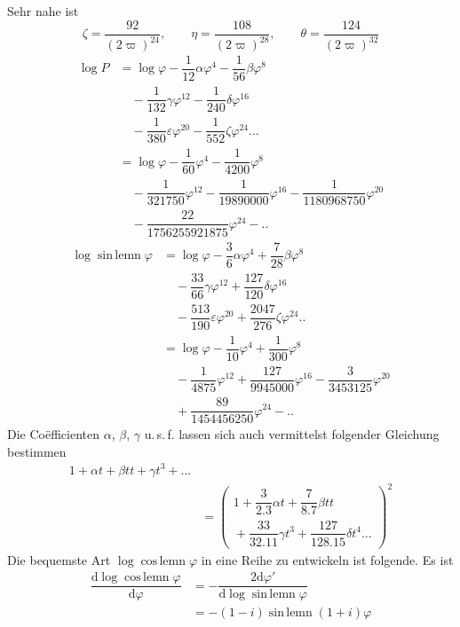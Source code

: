 Sehr nahe ist
\[
\zeta=\dfrac{92}{(2\varpi)^{24}},\qquad
\eta=\dfrac{108}{(2\varpi)^{28}},\qquad
\theta=\dfrac{124}{(2\varpi)^{32}}
\]
\[
\begin{aligned}
\log P&=\log\varphi-\dfrac1{12}\alpha\varphi^4-\dfrac1{56}\beta\varphi^8
\\[6pt]&\quad{}-\dfrac1{132}\gamma\varphi^{12}-\dfrac1{240}\delta\varphi^{16}
\\[6pt]&\quad{}-\dfrac1{380}\varepsilon\varphi^{20}-\dfrac1{552}\zeta\varphi^{24}\mathord{.}\mathord{.}\mathord{.}\\[6pt]
&=\log\varphi-\dfrac1{60}\varphi^4-\dfrac1{4200}\varphi^8
\\[6pt]&\quad{}-\dfrac1{321750}\varphi^{12}-\dfrac1{19890000}\varphi^{16}
-\dfrac1{1180968750}\varphi^{20}\\[6pt]
&\quad-\dfrac{22}{1756255921875}\varphi^{24}-\mathord{.}\mathord{.}
\end{aligned}
\]
\[
\begin{aligned}
\log\operatorname{sin\,lemn}\varphi
&=\log\varphi-\dfrac36\alpha\varphi^4+\dfrac7{28}\beta\varphi^8
\\[6pt]&\quad{}-\dfrac{33}{66}\gamma\varphi^{12}+\dfrac{127}{120}\delta\varphi^{16}
\\[6pt]&\quad{}-\dfrac{513}{190}\varepsilon\varphi^{20}+\dfrac{2047}{276}\zeta\varphi^{24}\mathord{.}\mathord{.}\\[6pt]
&=\log\varphi-\dfrac1{10}\varphi^4+\dfrac1{300}\varphi^8
\\[6pt]&\quad{}-\dfrac1{4875}\varphi^{12}+\dfrac{127}{9945000}\varphi^{16}
-\dfrac3{3453125}\varphi^{20}\\[6pt]
&\quad+\dfrac{89}{1454456250}\varphi^{24}-\mathord{.}\mathord{.}
\end{aligned}
\]
Die Coëfficienten $\alpha$, $\beta$, $\gamma$ u.\,s.\,f. lassen sich auch vermittelst folgender Gleichung bestimmen
\[
\begin{aligned}1+\alpha t+\beta tt+\gamma t^3+\mathord{.}\mathord{.}\mathord{.}
\\[6pt]&=\left(\begin{gathered}1+\dfrac3{2.3}\alpha t+\dfrac7{8.7}\beta tt
\\[4pt]{}+\dfrac{33}{32.11}\gamma t^3+\dfrac{127}{128.15}\delta t^4\mathord{.}\mathord{.}\mathord{.}\end{gathered}\right)^2\end{aligned}
\]
Die bequemste Art $\log\operatorname{cos\,lemn}\varphi$ in eine Reihe zu entwickeln ist folgende. Es ist
\[
\begin{aligned}\dfrac{\mathrm d\log\operatorname{cos\,lemn}\varphi}{\mathrm d\varphi}
&=-\dfrac{2\mathrm d\varphi'}{\mathrm d\log\operatorname{sin\,lemn}\varphi}
\\[7pt]&=-(1-i)\operatorname{sin\,lemn}(1+i)\varphi\end{aligned}
\]
